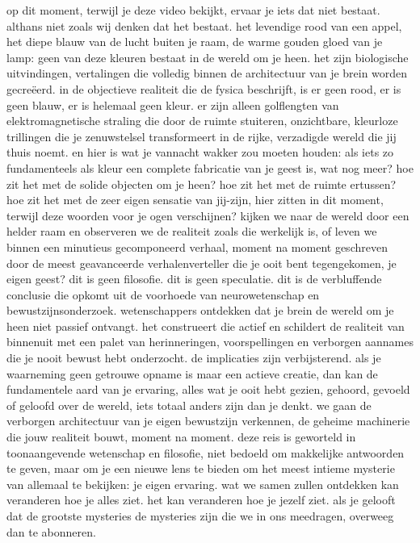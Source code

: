 op dit moment, terwijl je deze video bekijkt, ervaar je iets dat niet bestaat. althans niet zoals wij denken dat het bestaat. het levendige rood van een appel, het diepe blauw van de lucht buiten je raam, de warme gouden gloed van je lamp: geen van deze kleuren bestaat in de wereld om je heen. het zijn biologische uitvindingen, vertalingen die volledig binnen de architectuur van je brein worden gecreëerd. in de objectieve realiteit die de fysica beschrijft, is er geen rood, er is geen blauw, er is helemaal geen kleur. er zijn alleen golflengten van elektromagnetische straling die door de ruimte stuiteren, onzichtbare, kleurloze trillingen die je zenuwstelsel transformeert in de rijke, verzadigde wereld die jij thuis noemt. en hier is wat je vannacht wakker zou moeten houden: als iets zo fundamenteels als kleur een complete fabricatie van je geest is, wat nog meer? hoe zit het met de solide objecten om je heen? hoe zit het met de ruimte ertussen? hoe zit het met de zeer eigen sensatie van jij-zijn, hier zitten in dit moment, terwijl deze woorden voor je ogen verschijnen? kijken we naar de wereld door een helder raam en observeren we de realiteit zoals die werkelijk is, of leven we binnen een minutieus gecomponeerd verhaal, moment na moment geschreven door de meest geavanceerde verhalenverteller die je ooit bent tegengekomen, je eigen geest?
dit is geen filosofie. dit is geen speculatie. dit is de verbluffende conclusie die opkomt uit de voorhoede van neurowetenschap en bewustzijnsonderzoek. wetenschappers ontdekken dat je brein de wereld om je heen niet passief ontvangt. het construeert die actief en schildert de realiteit van binnenuit met een palet van herinneringen, voorspellingen en verborgen aannames die je nooit bewust hebt onderzocht. de implicaties zijn verbijsterend. als je waarneming geen getrouwe opname is maar een actieve creatie, dan kan de fundamentele aard van je ervaring, alles wat je ooit hebt gezien, gehoord, gevoeld of geloofd over de wereld, iets totaal anders zijn dan je denkt. we gaan de verborgen architectuur van je eigen bewustzijn verkennen, de geheime machinerie die jouw realiteit bouwt, moment na moment.
deze reis is geworteld in toonaangevende wetenschap en filosofie, niet bedoeld om makkelijke antwoorden te geven, maar om je een nieuwe lens te bieden om het meest intieme mysterie van allemaal te bekijken: je eigen ervaring. wat we samen zullen ontdekken kan veranderen hoe je alles ziet. het kan veranderen hoe je jezelf ziet. als je gelooft dat de grootste mysteries de mysteries zijn die we in ons meedragen, overweeg dan te abonneren.
